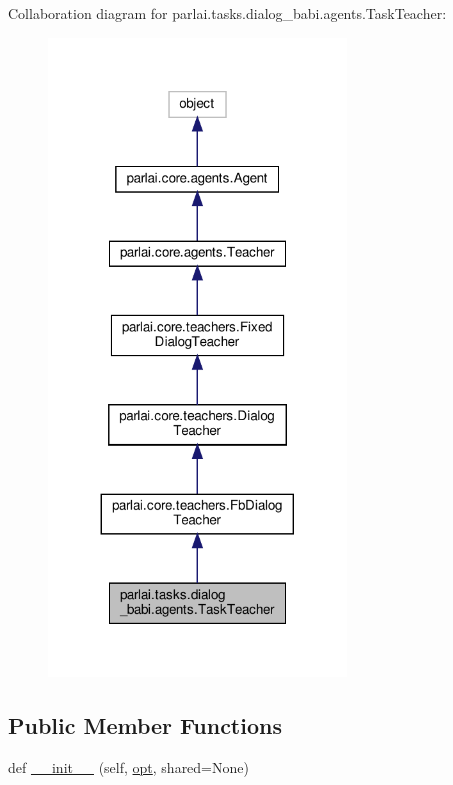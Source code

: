 Collaboration diagram for parlai.\+tasks.\+dialog\+\_\+babi.\+agents.\+Task\+Teacher\+:\nopagebreak
\begin{figure}[H]
\begin{center}
\leavevmode
\includegraphics[width=224pt]{d7/d2f/classparlai_1_1tasks_1_1dialog__babi_1_1agents_1_1TaskTeacher__coll__graph}
\end{center}
\end{figure}
\subsection*{Public Member Functions}
\begin{DoxyCompactItemize}
\item 
def \hyperlink{classparlai_1_1tasks_1_1dialog__babi_1_1agents_1_1TaskTeacher_a04ad8a9d7b96a3115bc3661bb875eeef}{\+\_\+\+\_\+init\+\_\+\+\_\+} (self, \hyperlink{classparlai_1_1core_1_1teachers_1_1FbDialogTeacher_af7a9ec497b9cd0292d7b8fa220da7c28}{opt}, shared=None)
\end{DoxyCompactItemize}
